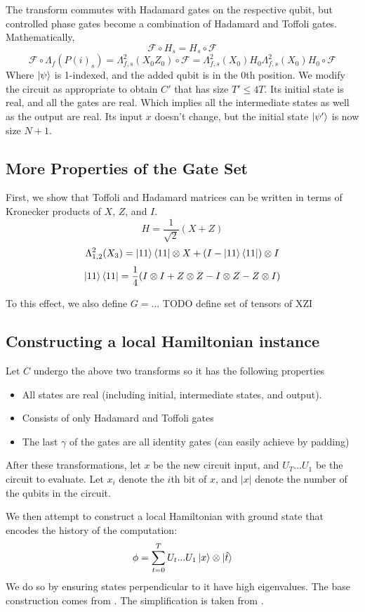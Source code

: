 The transform commutes with Hadamard gates on the respective qubit, but controlled phase gates become a combination of Hadamard and Toffoli gates. Mathematically,
$$\mathcal{F}\circ H_s=H_s\circ\mathcal{F}$$
$$\mathcal{F}\circ\Lambda_f(P(i)_s)=\Lambda^2_{f,s}(X_0Z_0)\circ\mathcal{F}=\Lambda^2_{f,s}(X_0)H_0\Lambda^2_{f,s}(X_0)H_0\circ\mathcal{F}$$
Where $\ket{\psi}$ is 1-indexed, and the added qubit is in the 0th position. We modify the circuit as appropriate to obtain $C'$ that has size $T'\leq 4T$. Its initial state is real, and all the gates are real. Which implies all the intermediate states as well as the output are real. Its input $x$ doesn't change, but the initial state $\ket{\psi'}$ is now size $N+1$.

\subsection{More Properties of the Gate Set}

First, we show that Toffoli and Hadamard matrices can be written in terms of Kronecker products of $X$, $Z$, and $I$.
$$H=\frac{1}{\sqrt{2}}(X+Z)$$
$$\Lambda^2_{1,2}(X_3)=\ket{11}\bra{11}\otimes X+(I-\ket{11}\bra{11})\otimes I$$
$$\ket{11}\bra{11}=\frac{1}{4}(I\otimes I+Z\otimes Z-I\otimes Z-Z\otimes I)$$

To this effect, we also define $G=$... TODO define set of tensors of XZI

\subsection{Constructing a local Hamiltonian instance}

Let $C$ undergo the above two transforms so it has the following properties
\begin{itemize}
	\item All states are real (including initial, intermediate states, and output).
	\item Consists of only Hadamard and Toffoli gates
	\item The last $\gamma$ of the gates are all identity gates (can easily achieve by padding)
\end{itemize}

After these transformations, let $x$ be the new circuit input, and $U_T...U_1$ be the circuit to evaluate. Let $x_i$ denote the $i$th bit of $x$, and $|x|$ denote the number of the qubits in the circuit.

We then attempt to construct a local Hamiltonian with ground state that encodes the history of the computation: $$\phi=\sum_{t=0}^TU_t...U_1\ket{x}\otimes\ket{\hat{t}}$$
We do so by ensuring states perpendicular to it have high eigenvalues. The base construction comes from \cite{kitaev2002classical}. The simplification is taken from \cite{PhysRevA.78.012352}.

